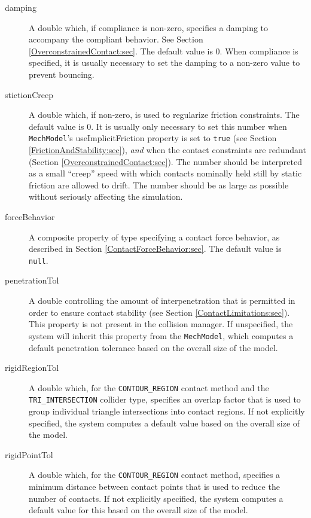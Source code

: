 \begin{description}
\item[damping]\mbox{}

A double which, if {\sf compliance} is non-zero, specifies a damping
to accompany the compliant behavior. See Section
\ref{OverconstrainedContact:sec}.  The default value is 0.  When
compliance is specified, it is usually necessary to set the damping to
a non-zero value to prevent bouncing.

\item[stictionCreep]\mbox{}

A double which, if non-zero, is used to regularize friction
constraints. The default value is 0. It is usually only necessary to
set this number when {\tt MechModel}'s {\sf useImplicitFriction}
property is set to {\tt true} (see
Section \ref{FrictionAndStability:sec}), {\it and} when the contact
constraints are redundant (Section
\ref{OverconstrainedContact:sec}).  The number should be interpreted
as a small ``creep'' speed with which contacts nominally held still
by static friction are allowed to drift. The number should be as large
as possible without seriously affecting the simulation.

\item[forceBehavior]\mbox{}

A composite property
of type 
specifying a contact force behavior, as described in
Section \ref{ContactForceBehavior:sec}. The default value is {\tt
null}.

\item[penetrationTol]\mbox{}

A double controlling the amount of interpenetration that is permitted
in order to ensure contact stability (see Section
\ref{ContactLimitations:sec}). This property is not
present in the collision manager. If unspecified, the system will
inherit this property from the {\tt MechModel}, which computes a
default penetration tolerance based on the overall size of the model.

\item[rigidRegionTol]\mbox{}

A double which, for the {\tt CONTOUR\_REGION} contact method and the
{\tt TRI\_INTERSECTION} collider type, specifies an overlap factor
that is used to group individual triangle intersections into contact
regions. If not explicitly specified, the system computes a default
value based on the overall size of the model.

\item[rigidPointTol]\mbox{}

A double which, for the {\tt CONTOUR\_REGION} contact method,
specifies a minimum distance between contact points that is used to
reduce the number of contacts. If not explicitly specified, the system
computes a default value for this based on the overall size of the
model.

\end{description}

